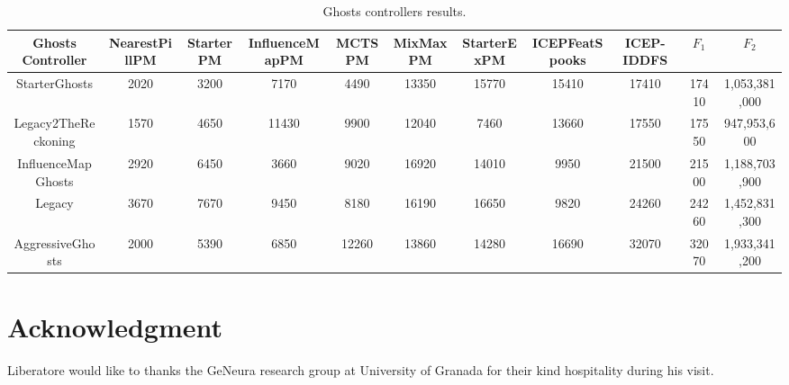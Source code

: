 \documentclass[journal]{IEEEtran}
\begin{document}
\begin{table}
\caption{Ghosts controllers results.}
\label{tab:results_ghosts}
\centering
\footnotesize
\begin{tabular}{|c|cccccccc|cc|}
\hline
Ghosts Controller & NearestPillPM & StarterPM & InfluenceMapPM & MCTSPM & MixMaxPM & StarterExPM & ICEPFeatSpooks & ICEP-IDDFS & $F_1$ & $F_2$	\\
\hline
StarterGhosts	&	2020	&	3200	&	7170	&	4490	&	13350	&	15770	&	15410	&	17410	&	17410	&	1,053,381,000	\\
Legacy2TheReckoning	&	1570	&	4650	&	11430	&	9900	&	12040	&	7460	&	13660	&	17550	&	17550	&	947,953,600	\\
InfluenceMapGhosts	\cite{Svensson2012} &	2920	&	6450	&	3660	&	9020	&	16920	&	14010	&	9950	&	21500	&	21500	&	1,188,703,900	\\
Legacy	&	3670	&	7670	&	9450	&	8180	&	16190	&	16650	&	9820	&	24260	&	24260	&	1,452,831,300	\\
AggressiveGhosts	&	2000	&	5390	&	6850	&	12260	&	13860	&	14280	&	16690	&	32070	&	32070	&	1,933,341,200	\\
\hline
\end{tabular}
\end{table}

\section*{Acknowledgment}
Liberatore would like to thanks the GeNeura research group at
University of Granada for their kind hospitality during his visit.




% 


\end{document}
